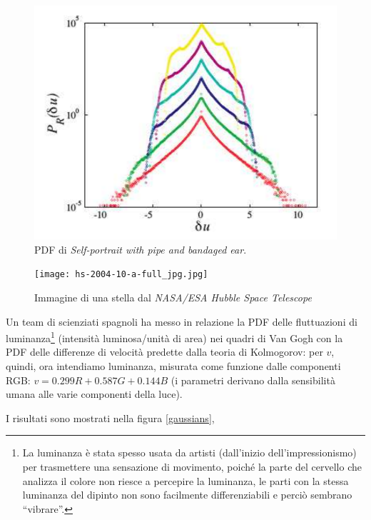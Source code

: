 \documentclass[12pt,a4paper]{article}
\numberwithin{equation}{section}
\begin{document}
\begin{figure}
    \centering
    \includegraphics[scale=0.4]{PDF_self_portrait.png}
    \caption{PDF di \emph{Self-portrait with pipe and bandaged ear}.}
    \label{selfpdf}
\end{figure}

\begin{figure}
    \centering
    \texttt{[image: hs-2004-10-a-full\_jpg.jpg]}
    \caption{Immagine di una stella dal \emph{NASA/ESA Hubble Space
Telescope}}
    \label{galaxy}
\end{figure}


Un team di scienziati spagnoli \cite{study2006} ha messo in relazione la PDF delle fluttuazioni di luminanza\footnote{La luminanza è stata spesso usata da artisti (dall'inizio dell'impressionismo) per trasmettere una sensazione di movimento, poiché la parte del cervello che analizza il colore non riesce a percepire la luminanza, le parti con la stessa luminanza del dipinto non sono facilmente differenziabili e perciò sembrano ``vibrare''.} (intensità luminosa/unità di area) nei quadri di Van Gogh con la PDF delle differenze di velocità predette dalla teoria di Kolmogorov: per $v$, quindi, ora intendiamo luminanza, misurata come funzione dalle componenti RGB: $v = 0.299 R + 0.587 G + 0.144B$ (i parametri derivano dalla sensibilità umana alle varie componenti della luce).

I risultati sono mostrati nella figura \ref{gaussians}, 
\end{document}
